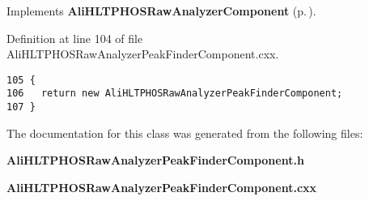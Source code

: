 Implements {\bf Ali\-HLTPHOSRaw\-Analyzer\-Component} {\rm (p.\,\pageref{classAliHLTPHOSRawAnalyzerComponent_a16})}.

Definition at line 104 of file Ali\-HLTPHOSRaw\-Analyzer\-Peak\-Finder\-Component.cxx.

\footnotesize\begin{verbatim}105 {
106   return new AliHLTPHOSRawAnalyzerPeakFinderComponent;
107 }
\end{verbatim}\normalsize 




The documentation for this class was generated from the following files:\begin{CompactItemize}
\item 
{\bf Ali\-HLTPHOSRaw\-Analyzer\-Peak\-Finder\-Component.h}\item 
{\bf Ali\-HLTPHOSRaw\-Analyzer\-Peak\-Finder\-Component.cxx}\end{CompactItemize}
